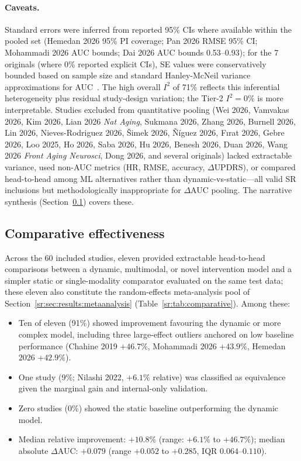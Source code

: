 \paragraph{Caveats.}
Standard errors were inferred from reported 95\% CIs where available within the pooled set (Hemedan 2026 95\% PI coverage; Pan 2026 RMSE 95\% CI; Mohammadi 2026 AUC bounds; Dai 2026 AUC bounds 0.53--0.93); for the 7 originals (where 0\% reported explicit CIs), SE values were conservatively bounded based on sample size and standard Hanley-McNeil variance approximations for AUC~\cite{hanley1982}. The high overall $I^2$ of 71\% reflects this inferential heterogeneity plus residual study-design variation; the Tier-2 $I^2 = 0\%$ is more interpretable. Studies excluded from quantitative pooling (Wei 2026, Vamvakas 2026, Kim 2026, Lian 2026 \textit{Nat Aging}, Sukmana 2026, Zhang 2026, Burnell 2026, Lin 2026, Nieves-Rodriguez 2026, \v{S}imek 2026, \~{N}\'{i}guez 2026, F\i rat 2026, Gebre 2026, Loo 2025, Ho 2026, Saba 2026, Hu 2026, Benesh 2026, Duan 2026, Wang 2026 \textit{Front Aging Neurosci}, Dong 2026, and several originals) lacked extractable variance, used non-AUC metrics (HR, RMSE, accuracy, $\Delta$UPDRS), or compared head-to-head among ML alternatives rather than dynamic-vs-static---all valid SR inclusions but methodologically inappropriate for $\Delta$AUC pooling. The narrative synthesis (Section~\ref{sr:sec:results:comparative}) covers these.

\subsection{Comparative effectiveness}
\label{sr:sec:results:comparative}

Across the 60 included studies, eleven provided extractable head-to-head comparisons between a dynamic, multimodal, or novel intervention model and a simpler static or single-modality comparator evaluated on the same test data; these eleven also constitute the random-effects meta-analysis pool of Section~\ref{sr:sec:results:metaanalysis} (Table~\ref{sr:tab:comparative}). Among these:
\begin{itemize}
    \item Ten of eleven (91\%) showed improvement favouring the dynamic or more complex model, including three large-effect outliers anchored on low baseline performance (Chahine 2019 $+46.7\%$, Mohammadi 2026 $+43.9\%$, Hemedan 2026 $+42.9\%$).
    \item One study (9\%; Nilashi 2022, $+6.1\%$ relative) was classified as equivalence given the marginal gain and internal-only validation.
    \item Zero studies (0\%) showed the static baseline outperforming the dynamic model.
    \item Median relative improvement: $+10.8\%$ (range: $+6.1\%$ to $+46.7\%$); median absolute $\Delta$AUC: $+0.079$ (range $+0.052$ to $+0.285$, IQR $0.064$--$0.110$).
\end{itemize}


